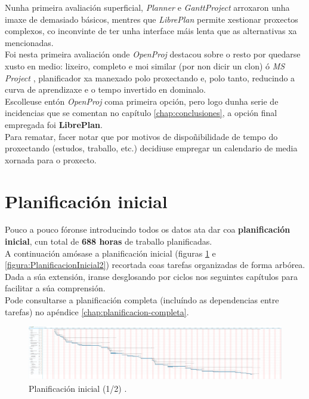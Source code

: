 Nunha primeira avaliación superficial, \textit{Planner} e \textit{GanttProject}
arroxaron unha imaxe de demasiado básicos, mentres que \textit{LibrePlan}
permite xestionar proxectos complexos, co inconvinte de ter unha interface máis
lenta que as alternativas xa mencionadas. \\

Foi nesta primeira avaliación onde \textit{OpenProj} destacou sobre o resto por
quedarse xusto en medio: lixeiro, completo e moi similar (por non dicir un
clon) ó \textit{MS Project} \cite{MSProject}, planificador xa manexado polo
proxectando e, polo tanto, reducindo a curva de aprendizaxe e o tempo invertido
en dominalo. \\

Escolleuse entón \textit{OpenProj} coma primeira opción, pero logo dunha serie
de incidencias que se comentan no capítulo \ref{chap:conclusiones}, a opción
final empregada foi \textbf{LibrePlan}. \\

Para rematar, facer notar que por motivos de dispoñibilidade de tempo do
proxectando (estudos, traballo, etc.) decidiuse empregar un calendario de media
xornada para o proxecto.

\section{Planificación inicial}

Pouco a pouco fóronse introducindo todos os datos ata dar coa
\textbf{planificación inicial}, cun total de \textbf{688 horas} de traballo
planificadas. \\

A continuación amósase a planificación inicial (figuras
\ref{figura:PlanificacionInicial1} e \ref{figura:PlanificacionInicial2})
recortada coas tarefas organizadas de forma arbórea. Dada a súa extensión,
iranse desglosando por ciclos nos seguintes capítulos para facilitar a súa
comprensión. \\

Pode consultarse a planificación completa (incluíndo as dependencias entre
tarefas) no apéndice \ref{chap:planificacion-completa}.

\begin{figure}[htbp]
 \centering
 \includegraphics[trim=0 20cm 230cm 0,clip=true,scale=0.6,keepaspectratio=true]{./imagenes/planificacion-inicial.png}
 \caption[Planificación inicial (1/2)]{Planificación inicial (1/2) \cite{LibrePlan}.}
 \label{figura:PlanificacionInicial1}
\end{figure}

